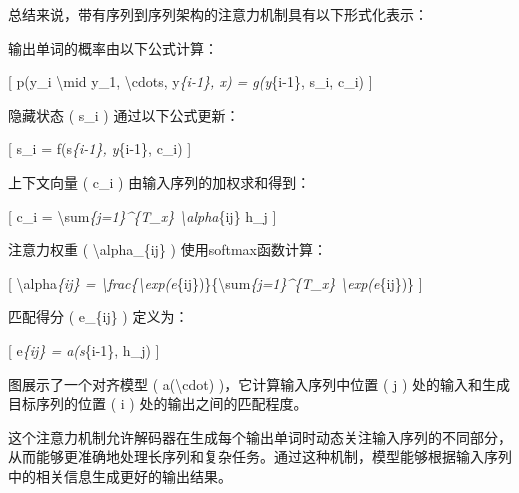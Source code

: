 总结来说，带有序列到序列架构的注意力机制具有以下形式化表示：

输出单词的概率由以下公式计算：

{[} p(y\_i \textbackslash mid y\_1, \textbackslash cdots,
y\emph{\{i-1\}, x) = g(y}\{i-1\}, s\_i, c\_i) {]}


隐藏状态 ( s\_i ) 通过以下公式更新：

{[} s\_i = f(s\emph{\{i-1\}, y}\{i-1\}, c\_i) {]}


上下文向量 ( c\_i ) 由输入序列的加权求和得到：

{[} c\_i = \textbackslash sum\emph{\{j=1\}\^{}\{T\_x\}
\textbackslash alpha}\{ij\} h\_j {]}


注意力权重 ( \textbackslash alpha\_\{ij\} ) 使用softmax函数计算：

{[} \textbackslash alpha\emph{\{ij\} =
\textbackslash frac\{\textbackslash exp(e}\{ij\})\}\{\textbackslash sum\emph{\{j=1\}\^{}\{T\_x\}
\textbackslash exp(e}\{ij\})\} {]}


匹配得分 ( e\_\{ij\} ) 定义为：

{[} e\emph{\{ij\} = a(s}\{i-1\}, h\_j) {]}


图展示了一个对齐模型 ( a(\textbackslash cdot) )，它计算输入序列中位置 (
j ) 处的输入和生成目标序列的位置 ( i ) 处的输出之间的匹配程度。


这个注意力机制允许解码器在生成每个输出单词时动态关注输入序列的不同部分，从而能够更准确地处理长序列和复杂任务。通过这种机制，模型能够根据输入序列中的相关信息生成更好的输出结果。

